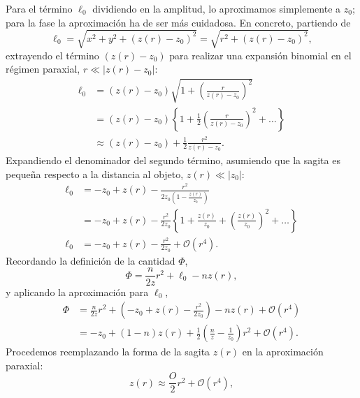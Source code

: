Para el término $\ell_0$ dividiendo en la amplitud, lo aproximamos simplemente a $z_0$; para la fase la aproximación ha de ser más cuidadosa. En concreto, partiendo de
\begin{equation}
    \ell_0
    =
    \sqrt{x^2 + y^2 + (z(r) - z_0)^2}
    =
    \sqrt{r^2 + (z(r) - z_0)^2},
\end{equation}
extrayendo el término $(z(r) - z_0)$ para realizar una expansión binomial en el régimen paraxial, $r \ll |z(r)-z_0|$:
\begin{align}
    \ell_0
    &=
    (z(r) - z_0)
    \sqrt{
    1
    +
    \left(
    \frac{r}{z(r) - z_0}
    \right)^2
    }
    \nonumber
    \\
    &=
    (z(r) - z_0)
    \left\{
    1
    +
    \frac{1}{2}
    \left(
    \frac{r}{z(r) - z_0}
    \right)^2
    +
    \dots
    \right\}
    \nonumber
    \\
    &\approx
    (z(r) - z_0)
    +
    \frac{1}{2}
    \frac{r^2}{z(r) - z_0}.
\end{align}
Expandiendo el denominador del segundo término, asumiendo que la sagita es pequeña respecto a la distancia al objeto, $z(r)\ll |z_0|$:
\begin{align}
    \ell_0
    &=
    -z_0
    +
    z(r)
    -
    \frac{r^2}{2z_0\left(1-\frac{z(r)}{z_0}\right)}
    \nonumber
    \\
    &=
    -z_0
    +
    z(r)
    -
    \frac{r^2}{2z_0}
    \left\{
    1
    +
    \frac{z(r)}{z_0}
    +
    \left(\frac{z(r)}{z_0}\right)^2
    +
    \dots
    \right\}
    \nonumber
    \\
    \ell_0
    &=
    -z_0
    +
    z(r)
    -
    \frac{r^2}{2z_0}
    +
    \mathcal{O}(r^4).
\end{align}
Recordando la definición de la cantidad $\Phi$,
\begin{equation}
    \Phi
    =
    \frac{n}{2z}r^2
    +
    \ell_0
    -
    nz(r),
  \label{eq:phase_definition}
\end{equation}
y aplicando la aproximación para $\ell_0$,
\begin{align}
  \Phi
  &=
  \frac{n}{2z}r^2
  +
  \left(
  -z_0
  +
  z(r)
  -
  \frac{r^2}{2z_0}
  \right)
  -
  nz(r)
  +
  \mathscr O(r^4)
  \nonumber
  \\
  &=
  -z_0
  +
  (1-n)z(r)
  +
  \frac{1}{2}
  \left(
  \frac{n}{z}
  -
  \frac{1}{z_0}
  \right)r^2
  +
  \mathscr O(r^4).
\end{align}
Procedemos reemplazando la forma de la sagita $z(r)$ en la aproximación paraxial:
\begin{equation}
    z(r)
    \approx
    \frac{O}{2}r^2
    +
    \mathcal{O}(r^4),
\end{equation}
